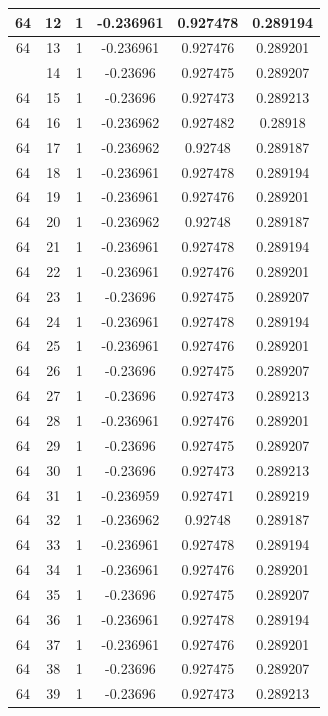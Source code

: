 \documentclass[12pt,a4paper]{article}
\numberwithin{equation}{section}
\numberwithin{figure}{section}
\numberwithin{table}{section}
\begin{document}
\begin{longtable}{|c|c|c|c|c|c|}
64 & 12 & 1 & -0.236961 & 0.927478 & 0.289194 \\ \hline
64 & 13 & 1 & -0.236961 & 0.927476 & 0.289201 \\ \hline
\pagebreak
64 & 14 & 1 & -0.23696 & 0.927475 & 0.289207 \\ \hline
64 & 15 & 1 & -0.23696 & 0.927473 & 0.289213 \\ \hline
64 & 16 & 1 & -0.236962 & 0.927482 & 0.28918 \\ \hline
64 & 17 & 1 & -0.236962 & 0.92748 & 0.289187 \\ \hline
64 & 18 & 1 & -0.236961 & 0.927478 & 0.289194 \\ \hline
64 & 19 & 1 & -0.236961 & 0.927476 & 0.289201 \\ \hline
64 & 20 & 1 & -0.236962 & 0.92748 & 0.289187 \\ \hline
64 & 21 & 1 & -0.236961 & 0.927478 & 0.289194 \\ \hline
64 & 22 & 1 & -0.236961 & 0.927476 & 0.289201 \\ \hline
64 & 23 & 1 & -0.23696 & 0.927475 & 0.289207 \\ \hline
64 & 24 & 1 & -0.236961 & 0.927478 & 0.289194 \\ \hline
64 & 25 & 1 & -0.236961 & 0.927476 & 0.289201 \\ \hline
64 & 26 & 1 & -0.23696 & 0.927475 & 0.289207 \\ \hline
64 & 27 & 1 & -0.23696 & 0.927473 & 0.289213 \\ \hline
64 & 28 & 1 & -0.236961 & 0.927476 & 0.289201 \\ \hline
64 & 29 & 1 & -0.23696 & 0.927475 & 0.289207 \\ \hline
64 & 30 & 1 & -0.23696 & 0.927473 & 0.289213 \\ \hline
64 & 31 & 1 & -0.236959 & 0.927471 & 0.289219 \\ \hline
64 & 32 & 1 & -0.236962 & 0.92748 & 0.289187 \\ \hline
64 & 33 & 1 & -0.236961 & 0.927478 & 0.289194 \\ \hline
64 & 34 & 1 & -0.236961 & 0.927476 & 0.289201 \\ \hline
64 & 35 & 1 & -0.23696 & 0.927475 & 0.289207 \\ \hline
64 & 36 & 1 & -0.236961 & 0.927478 & 0.289194 \\ \hline
64 & 37 & 1 & -0.236961 & 0.927476 & 0.289201 \\ \hline
64 & 38 & 1 & -0.23696 & 0.927475 & 0.289207 \\ \hline
64 & 39 & 1 & -0.23696 & 0.927473 & 0.289213 \\ \hline

\end{longtable}
\end{document}
